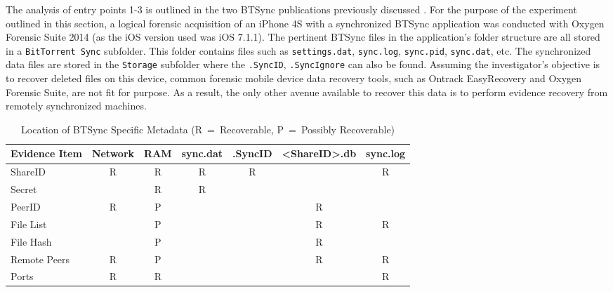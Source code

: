 \documentclass{jdfsl}
\begin{document}
The analysis of entry points 1-3 is outlined in the two BTSync publications previously discussed \citet{Farina2014S77, scanlon2014methodology}. For the purpose of the experiment outlined in this section, a logical forensic acquisition of an iPhone 4S with a synchronized BTSync application was conducted with Oxygen Forensic Suite 2014 (as the iOS version used was iOS 7.1.1). The pertinent BTSync files in the application's folder structure are all stored in a \texttt{BitTorrent Sync} subfolder. This folder contains files such as \texttt{settings.dat}, \texttt{sync.log}, \texttt{sync.pid}, \texttt{sync.dat}, etc. The synchronized data files are stored in the \texttt{Storage} subfolder where the \texttt{.SyncID}, \texttt{.SyncIgnore} can also be found. Assuming the investigator's objective is to recover deleted files on this device, common forensic mobile device data recovery tools, such as Ontrack EasyRecovery and Oxygen Forensic Suite, are not fit for purpose. As a result, the only other avenue available to recover this data is to perform evidence recovery from remotely synchronized machines.\\

\begin{table*}[!htpb]
\centering
    \begin{tabular}{|l|c|c|c|c|c|c|}
    \hline
     \textbf{Evidence Item}     & \textbf{Network} & \textbf{RAM} & \textbf{sync.dat} & \textbf{.SyncID} & \textbf{<ShareID>.db} & \textbf{sync.log} \\ \hline
     ShareID            &R               &R     &R        &R       & ~            &R        \\ \hline
     Secret             & ~               &R      &R        & ~       & ~            & ~        \\ \hline
     PeerID             &R               &P      &          & ~       &R            &          \\ \hline
     File List          & ~               &P      &          & ~       &R            &R        \\ \hline
     File Hash          & ~               &P      & ~        & ~       &R            & ~        \\ \hline
     Remote Peers       &R               &P      & ~        & ~       &R            &R        \\ \hline
     Ports              &R              &R      & ~        & ~       & ~            &R        \\ \hline
    \end{tabular}
\caption{Location of BTSync Specific Metadata (R~=~Recoverable, P~=~Possibly Recoverable)}
\label{metadata}
\end{table*}
\end{document}
